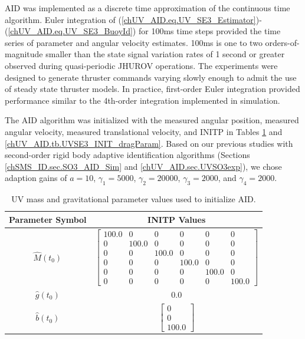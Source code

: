 \ac{AID} was implemented as a discrete time approximation of the
continuous time algorithm.  
%
%
Euler integration of
(\ref{chUV_AID.eq.UV_SE3_Estimator})-(\ref{chUV_AID.eq.UV_SE3_BuoyId})
for 100ms time steps
provided the time series of parameter and angular velocity
estimates.
%
100ms is one to two orders-of-magnitude smaller than the state signal
variation rates of 1 second or greater observed during quasi-periodic
\ac{JHUROV} operations.
%
The experiments were designed to generate thruster commands varying
slowly enough to admit the use of steady state thruster models.
%
In practice, first-order Euler integration provided performance
similar to the 4th-order integration implemented in simulation.


The \ac{AID} algorithm was initialized with the measured angular
position, measured angular velocity, measured translational velocity,
and \acf{INITP} in Tables \ref{chUV_AID.tb.UVSE3_INIT_massGravParam}
and \ref{chUV_AID.tb.UVSE3_INIT_dragParam}.
%
%
Based on our previous studies with second-order rigid body adaptive
identification algorithms (Sections \ref{chSMS_ID.sec.SO3_AID_Sim} and
\ref{chUV_AID.sec.UVSO3exp}), we chose adaption gains of $a=10$,
$\gamma_1=5000$, $\gamma_2=20000$, $\gamma_3=2000$, and
$\gamma_4=2000$.


\begin{table}[htbp]
\ssp
\caption{\ac{UV} mass and gravitational parameter values used to initialize \ac{AID}.}
\begin{center}
\begin{tabular}{c|c}
Parameter Symbol & \ac{INITP} Values \\ \hline
$\hat{M}(t_0)$ & $ \left[\begin{array}{cccccc} 100.0 & 0 & 0 & 0 & 0 & 0\\ 0 & 100.0 & 0 & 0 & 0 & 0\\ 0 & 0 & 100.0 & 0 & 0 & 0\\ 0 & 0 & 0 & 100.0 & 0 & 0\\ 0 & 0 & 0 & 0 & 100.0 & 0\\ 0 & 0 & 0 & 0 & 0 & 100.0 \end{array}\right] $ \\ 
$\hat{g}(t_0)$ & 0.0 \\ 
$\hat{b}(t_0)$ & $ \left[\begin{array}{c} 0\\ 0\\ 100.0 \end{array}\right] $ \\ 
\end{tabular}
\end{center}
\label{chUV_AID.tb.UVSE3_INIT_massGravParam}
\end{table}


